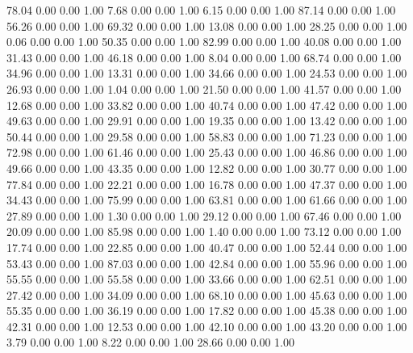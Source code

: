    78.04   0.00   0.00   1.00
    7.68   0.00   0.00   1.00
    6.15   0.00   0.00   1.00
   87.14   0.00   0.00   1.00
   56.26   0.00   0.00   1.00
   69.32   0.00   0.00   1.00
   13.08   0.00   0.00   1.00
   28.25   0.00   0.00   1.00
    0.06   0.00   0.00   1.00
   50.35   0.00   0.00   1.00
   82.99   0.00   0.00   1.00
   40.08   0.00   0.00   1.00
   31.43   0.00   0.00   1.00
   46.18   0.00   0.00   1.00
    8.04   0.00   0.00   1.00
   68.74   0.00   0.00   1.00
   34.96   0.00   0.00   1.00
   13.31   0.00   0.00   1.00
   34.66   0.00   0.00   1.00
   24.53   0.00   0.00   1.00
   26.93   0.00   0.00   1.00
    1.04   0.00   0.00   1.00
   21.50   0.00   0.00   1.00
   41.57   0.00   0.00   1.00
   12.68   0.00   0.00   1.00
   33.82   0.00   0.00   1.00
   40.74   0.00   0.00   1.00
   47.42   0.00   0.00   1.00
   49.63   0.00   0.00   1.00
   29.91   0.00   0.00   1.00
   19.35   0.00   0.00   1.00
   13.42   0.00   0.00   1.00
   50.44   0.00   0.00   1.00
   29.58   0.00   0.00   1.00
   58.83   0.00   0.00   1.00
   71.23   0.00   0.00   1.00
   72.98   0.00   0.00   1.00
   61.46   0.00   0.00   1.00
   25.43   0.00   0.00   1.00
   46.86   0.00   0.00   1.00
   49.66   0.00   0.00   1.00
   43.35   0.00   0.00   1.00
   12.82   0.00   0.00   1.00
   30.77   0.00   0.00   1.00
   77.84   0.00   0.00   1.00
   22.21   0.00   0.00   1.00
   16.78   0.00   0.00   1.00
   47.37   0.00   0.00   1.00
   34.43   0.00   0.00   1.00
   75.99   0.00   0.00   1.00
   63.81   0.00   0.00   1.00
   61.66   0.00   0.00   1.00
   27.89   0.00   0.00   1.00
    1.30   0.00   0.00   1.00
   29.12   0.00   0.00   1.00
   67.46   0.00   0.00   1.00
   20.09   0.00   0.00   1.00
   85.98   0.00   0.00   1.00
    1.40   0.00   0.00   1.00
   73.12   0.00   0.00   1.00
   17.74   0.00   0.00   1.00
   22.85   0.00   0.00   1.00
   40.47   0.00   0.00   1.00
   52.44   0.00   0.00   1.00
   53.43   0.00   0.00   1.00
   87.03   0.00   0.00   1.00
   42.84   0.00   0.00   1.00
   55.96   0.00   0.00   1.00
   55.55   0.00   0.00   1.00
   55.58   0.00   0.00   1.00
   33.66   0.00   0.00   1.00
   62.51   0.00   0.00   1.00
   27.42   0.00   0.00   1.00
   34.09   0.00   0.00   1.00
   68.10   0.00   0.00   1.00
   45.63   0.00   0.00   1.00
   55.35   0.00   0.00   1.00
   36.19   0.00   0.00   1.00
   17.82   0.00   0.00   1.00
   45.38   0.00   0.00   1.00
   42.31   0.00   0.00   1.00
   12.53   0.00   0.00   1.00
   42.10   0.00   0.00   1.00
   43.20   0.00   0.00   1.00
    3.79   0.00   0.00   1.00
    8.22   0.00   0.00   1.00
   28.66   0.00   0.00   1.00
